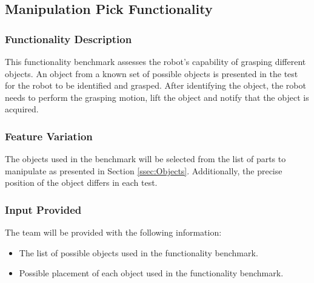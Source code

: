 

\subsection{Manipulation Pick Functionality}
\label{ssec:Manipulation}

\subsubsection{Functionality Description}
\label{sssec:ManipulationDescription}

This functionality benchmark assesses the robot's capability of grasping different objects. 
An object from a known set of possible objects is presented in the test for the robot to be identified and grasped.
After identifying the object, the robot needs to perform the grasping motion, lift the object and notify that the object is acquired.

\subsubsection{Feature Variation}
\label{sssec:FBMManipulationVariation}

The objects used in the benchmark will be selected from the list of parts to manipulate as presented in Section \ref{ssec:Objects}.
Additionally, the precise position of the object differs in each test.
\subsubsection{Input Provided}
\label{sssec:FBMManipulationInput}

The team will be provided with the following information:
\begin{itemize}
	\item The list of possible objects used in the functionality benchmark.
	\item Possible placement of each object used in the functionality benchmark.
\end{itemize}

